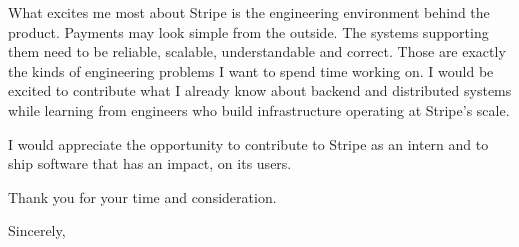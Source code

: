 \documentclass[10.5pt]{letter}
\begin{document}
\begin{letter}
What excites me most about Stripe is the engineering environment behind the product. Payments may look simple from the outside. The systems supporting them need to be reliable, scalable, understandable and correct. Those are exactly the kinds of engineering problems I want to spend time working on. I would be excited to contribute what I already know about backend and distributed systems while learning from engineers who build infrastructure operating at Stripe’s scale.

I would appreciate the opportunity to contribute to Stripe as an intern and to ship software that has an impact, on its users.

Thank you for your time and consideration.
\closing{
  Sincerely,
}


\end{letter}
\end{document}
